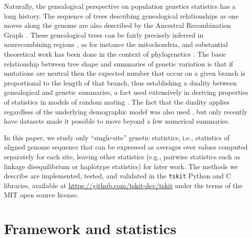 \documentclass{article}
\newcommand{\tskit}{{\texttt{tskit}}}
\begin{document}
Naturally, the genealogical perspective on population genetics statistics has a long history.
The sequence of trees describing genealogical relationships as one moves along the genome
are also described by the Ancestral Recombination
Graph~\citep{griffiths1991two,griffiths1996ancestral,rasmussen2014genome}.
These genealogical trees can be fairly precisely inferred in nonrecombining regions
\citep{felsenstein2004inferring},
as for instance the mitochondria,
and substantial theoretical work has been done in the context of phylogenetics \citep{semple2003phylogenetics}.
The basic relationship between tree shape and summaries of genetic variation
is that if mutations are neutral then the expected number that occur on a given branch
is proportional to the length of that branch,
thus establishing a duality between genealogical and genetic summaries,
a fact used extensively in deriving properties of statistics in models of random mating
\citep[e.g.][]{tajima1983evolutionary,tavare1984lineofdescent,fu1995statistical}.
The fact that the duality applies regardless of the underlying demographic model was also used
\citep[e.g.][]{gillespie1979evolutionary,hudson1983properties,slatkin1991inbreeding,mcvean2002genealogical,ralph2019empirical},
but only recently have datasets made it possible to move beyond a few numerical summaries.

In this paper, we study only ``single-site'' genetic statistics,
i.e., statistics of aligned genome sequence that can be expressed as averages over values computed
separately for each site,
leaving other statistics (e.g., pairwise statistics such as linkage disequilibrium
or haplotype statistics) for later work.
The methods we describe are implemented, tested, and validated in the \tskit{}
Python and C libraries, available at \url{https://github.com/tskit-dev/tskit}
under the terms of the MIT open source license.


\section*{Framework and statistics}
\end{document}
